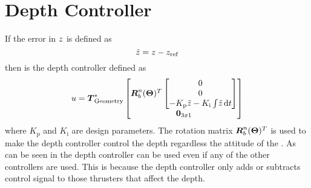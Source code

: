\section{Depth Controller}  
If the error in $\zPosition$ is defined as 
\begin{equation}
\tilde{\zPosition} = \zPosition - \zPosition_{\text{ref}}
\end{equation}
then is the \abbrPI depth controller defined as
\begin{equation}
u = \thrusterGeometryOnes[*]\begin{bmatrix} \boldsymbol{R}^n_b(\eulerAngles)^T \begin{bmatrix}
0 \\
0 \\
- K_{\text{p}} \tilde{\zPosition} - K_{\text{i}}\int \! \tilde{\zPosition} \, \mathrm{d}t
\end{bmatrix} \\ \zeroCol{3}\end{bmatrix}
\end{equation}
where $K_{\text{p}}$ and $K_{\text{i}}$ are design parameters. The rotation matrix $\boldsymbol{R}^n_b(\eulerAngles)^T$ is used to make the depth controller control the depth regardless the attitude of the \abbrROV. As can be seen in  the depth controller can be used even if any of the other controllers are used. This is because the depth controller only adds or subtracts control signal to those thrusters that affect the depth.


